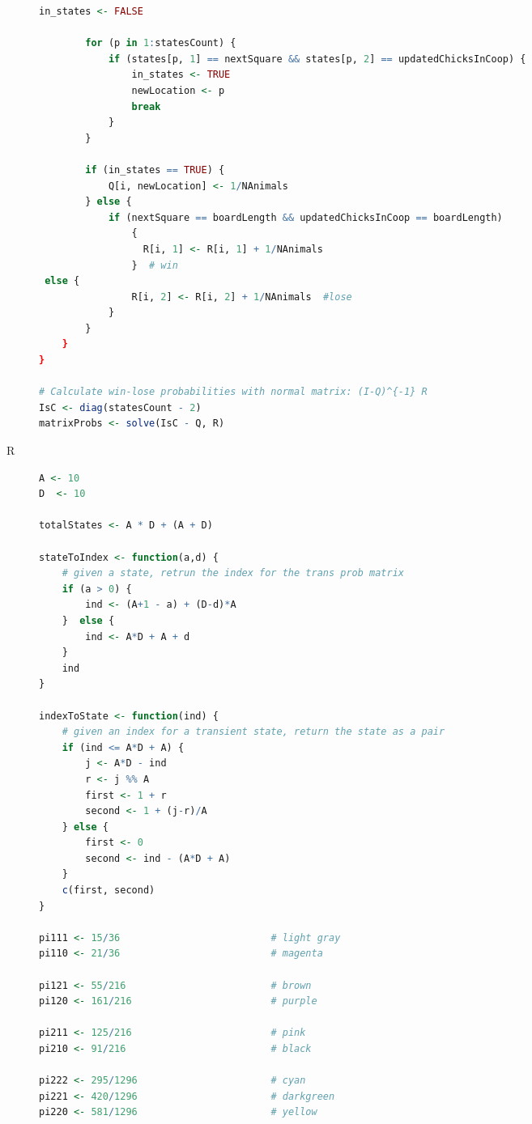 \begin{description}
\begin{lstlisting}[language=R]
        in_states <- FALSE
        
        for (p in 1:statesCount) {
            if (states[p, 1] == nextSquare && states[p, 2] == updatedChicksInCoop) {
                in_states <- TRUE
                newLocation <- p
                break
            }
        }
        
        if (in_states == TRUE) {
            Q[i, newLocation] <- 1/NAnimals
        } else {
            if (nextSquare == boardLength && updatedChicksInCoop == boardLength) 
                {
                  R[i, 1] <- R[i, 1] + 1/NAnimals
                }  # win
 else {
                R[i, 2] <- R[i, 2] + 1/NAnimals  #lose
            }
        }
    }
}

# Calculate win-lose probabilities with normal matrix: (I-Q)^{-1} R
IsC <- diag(statesCount - 2)
matrixProbs <- solve(IsC - Q, R)
\end{lstlisting}

\item[R] 


  \begin{lstlisting}[language=R]
A <- 10
D  <- 10

totalStates <- A * D + (A + D)

stateToIndex <- function(a,d) {
    # given a state, retrun the index for the trans prob matrix
    if (a > 0) {
        ind <- (A+1 - a) + (D-d)*A  
    }  else {
        ind <- A*D + A + d 
    }
    ind
}

indexToState <- function(ind) {
    # given an index for a transient state, return the state as a pair
    if (ind <= A*D + A) {
        j <- A*D - ind
        r <- j %% A
        first <- 1 + r
        second <- 1 + (j-r)/A
    } else {
        first <- 0
        second <- ind - (A*D + A)
    }
    c(first, second)
}

pi111 <- 15/36                          # light gray
pi110 <- 21/36                          # magenta

pi121 <- 55/216                         # brown
pi120 <- 161/216                        # purple

pi211 <- 125/216                        # pink
pi210 <- 91/216                         # black

pi222 <- 295/1296                       # cyan
pi221 <- 420/1296                       # darkgreen
pi220 <- 581/1296                       # yellow


\end{lstlisting}
\end{description}
